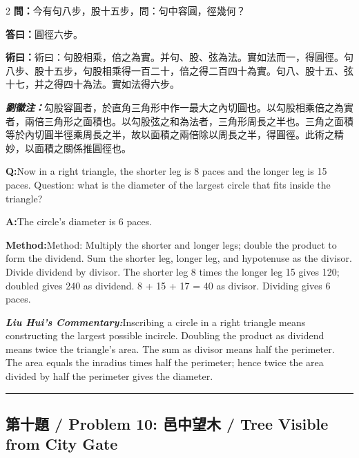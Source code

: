 \documentclass[11pt,a4paper]{article}
\newcommand{\cnwen}{\textcolor{cnlabelfg}{\textbf{問：}}}
\newcommand{\cnda}{\textbf{答曰：}}
\newcommand{\cnshu}{\textcolor{cnlabelfg}{\textbf{術曰：}}}
\newcommand{\cnzhu}{\textcolor{commentarycolor}{\textit{\textbf{劉徽注：}}}}
\newcommand{\enwen}{\textcolor{enlabelfg}{\textbf{Q:}}}
\newcommand{\enda}{\textcolor{enlabelfg}{\textbf{A:}}}
\newcommand{\enshu}{\textcolor{enlabelfg}{\textbf{Method:}}}
\newcommand{\enzhu}{\textcolor{enlabelfg}{\textit{\textbf{Liu Hui's Commentary:}}}}
\begin{document}
\begin{paracol}{2}
\switchcolumn[0]
\cnwen 今有句八步，股十五步，問：句中容圓，徑幾何？

\cnda 圓徑六步。

\cnshu 術曰：句股相乘，倍之為實。并句、股、弦為法。實如法而一，得圓徑。句八步、股十五步，句股相乘得一百二十，倍之得二百四十為實。句八、股十五、弦十七，并之得四十為法。實如法得六步。

\cnzhu 勾股容圓者，於直角三角形中作一最大之內切圓也。以勾股相乘倍之為實者，兩倍三角形之面積也。以勾股弦之和為法者，三角形周長之半也。三角之面積等於內切圓半徑乘周長之半，故以面積之兩倍除以周長之半，得圓徑。此術之精妙，以面積之關係推圓徑也。

\switchcolumn[1]
\enwen Now in a right triangle, the shorter leg is 8 paces and the longer leg is 15 paces. Question: what is the diameter of the largest circle that fits inside the triangle?

\enda The circle's diameter is 6 paces.

\enshu Method: Multiply the shorter and longer legs; double the product to form the dividend. Sum the shorter leg, longer leg, and hypotenuse as the divisor. Divide dividend by divisor. The shorter leg 8 times the longer leg 15 gives 120; doubled gives 240 as dividend. 8 + 15 + 17 = 40 as divisor. Dividing gives 6 paces.

\enzhu Inscribing a circle in a right triangle means constructing the largest possible incircle. Doubling the product as dividend means twice the triangle's area. The sum as divisor means half the perimeter. The area equals the inradius times half the perimeter; hence twice the area divided by half the perimeter gives the diameter.
\end{paracol}

\bigskip\hrule\bigskip

\subsection{第十題 / Problem 10: 邑中望木 / Tree Visible from City Gate}
\end{document}
